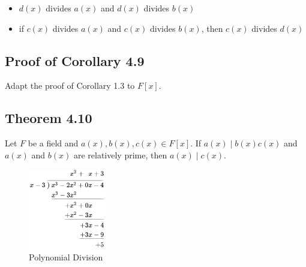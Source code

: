 \documentclass{article}
\begin{document}
\begin{itemize}
    \item $d(x)$ divides $a(x)$ and $d(x)$ divides $b(x)$
    \item if $c(x)$ divides $a(x)$ and $c(x)$ divides $b(x)$, then $c(x)$ divides $d(x)$
\end{itemize}

\subsection*{Proof of Corollary 4.9}
Adapt the proof of Corollary 1.3 to $F[x]$.

\subsection*{Theorem 4.10}
Let $F$ be a field and $a(x), b(x), c(x) \in F[x]$. If $a(x) \mid b(x)c(x)$ and $a(x)$ and $b(x)$ are relatively prime, then $a(x) \mid c(x)$.


\begin{figure}
    \centering
    \includegraphics[width=0.3\textwidth]{polynomialdivision.png}
    \caption{Polynomial Division}
    \label{fig:division_algorithm}
\end{figure}
\end{document}
